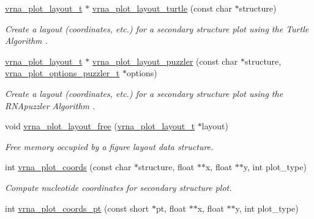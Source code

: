 \begin{DoxyCompactItemize}
\mbox{\hyperlink{group__plot__layout__utils_gac986fe092abc2a6a93ceb5141e4dd28b}{vrna\+\_\+plot\+\_\+layout\+\_\+t}} $\ast$ \mbox{\hyperlink{group__plot__layout__utils_ga4ecd3401e22933a44bf31d14320e59b1}{vrna\+\_\+plot\+\_\+layout\+\_\+turtle}} (const char $\ast$structure)
\begin{DoxyCompactList}\small\item\em Create a layout (coordinates, etc.) for a secondary structure plot using the {\itshape Turtle Algorithm} \cite{wiegreffe:2018}. \end{DoxyCompactList}\item 
\mbox{\hyperlink{group__plot__layout__utils_gac986fe092abc2a6a93ceb5141e4dd28b}{vrna\+\_\+plot\+\_\+layout\+\_\+t}} $\ast$ \mbox{\hyperlink{group__plot__layout__utils_ga57f815d56c8c083c016381213f581f1e}{vrna\+\_\+plot\+\_\+layout\+\_\+puzzler}} (const char $\ast$structure, \mbox{\hyperlink{group__plot__layout__utils_structvrna__plot__options__puzzler__t}{vrna\+\_\+plot\+\_\+options\+\_\+puzzler\+\_\+t}} $\ast$options)
\begin{DoxyCompactList}\small\item\em Create a layout (coordinates, etc.) for a secondary structure plot using the {\itshape R\+N\+Apuzzler Algorithm} \cite{wiegreffe:2018}. \end{DoxyCompactList}\item 
void \mbox{\hyperlink{group__plot__layout__utils_ga996128730020a2d7a7368b4248195931}{vrna\+\_\+plot\+\_\+layout\+\_\+free}} (\mbox{\hyperlink{group__plot__layout__utils_gac986fe092abc2a6a93ceb5141e4dd28b}{vrna\+\_\+plot\+\_\+layout\+\_\+t}} $\ast$layout)
\begin{DoxyCompactList}\small\item\em Free memory occupied by a figure layout data structure. \end{DoxyCompactList}\item 
int \mbox{\hyperlink{group__plot__layout__utils_ga2e2adbef0283a8ff2dfe5284eb1f4a6a}{vrna\+\_\+plot\+\_\+coords}} (const char $\ast$structure, float $\ast$$\ast$x, float $\ast$$\ast$y, int plot\+\_\+type)
\begin{DoxyCompactList}\small\item\em Compute nucleotide coordinates for secondary structure plot. \end{DoxyCompactList}\item 
int \mbox{\hyperlink{group__plot__layout__utils_gaccd6a87cb324b7d680e5dd93e112738b}{vrna\+\_\+plot\+\_\+coords\+\_\+pt}} (const short $\ast$pt, float $\ast$$\ast$x, float $\ast$$\ast$y, int plot\+\_\+type)

\end{DoxyCompactItemize}
